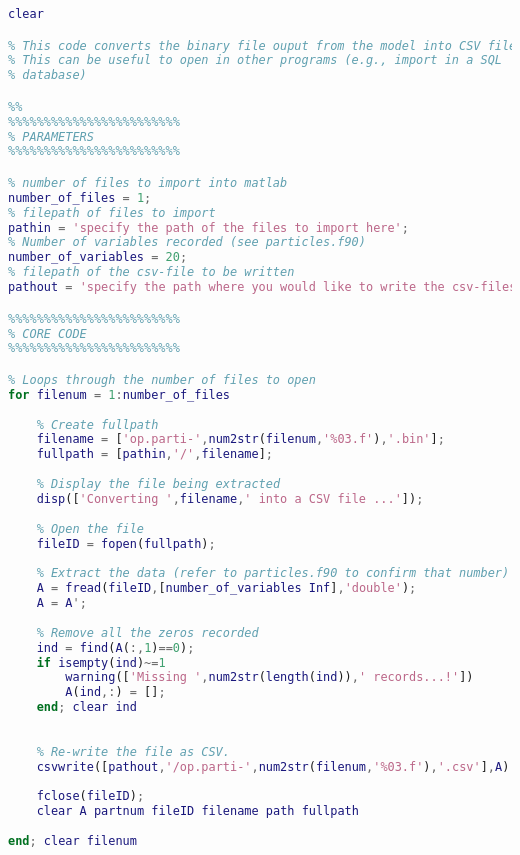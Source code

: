 \begin{lstlisting}[language=matlab]
clear

% This code converts the binary file ouput from the model into CSV files.
% This can be useful to open in other programs (e.g., import in a SQL
% database)

%%
%%%%%%%%%%%%%%%%%%%%%%%%
% PARAMETERS
%%%%%%%%%%%%%%%%%%%%%%%%

% number of files to import into matlab
number_of_files = 1;
% filepath of files to import
pathin = 'specify the path of the files to import here';
% Number of variables recorded (see particles.f90)
number_of_variables = 20;
% filepath of the csv-file to be written
pathout = 'specify the path where you would like to write the csv-files';

%%%%%%%%%%%%%%%%%%%%%%%%
% CORE CODE
%%%%%%%%%%%%%%%%%%%%%%%%

% Loops through the number of files to open
for filenum = 1:number_of_files
    
    % Create fullpath
    filename = ['op.parti-',num2str(filenum,'%03.f'),'.bin'];
    fullpath = [pathin,'/',filename];
    
    % Display the file being extracted
    disp(['Converting ',filename,' into a CSV file ...']);
    
    % Open the file
    fileID = fopen(fullpath);
    
    % Extract the data (refer to particles.f90 to confirm that number)
    A = fread(fileID,[number_of_variables Inf],'double');
    A = A';
    
    % Remove all the zeros recorded
    ind = find(A(:,1)==0);
    if isempty(ind)~=1
        warning(['Missing ',num2str(length(ind)),' records...!'])
        A(ind,:) = [];
    end; clear ind
    
    
    % Re-write the file as CSV.
    csvwrite([pathout,'/op.parti-',num2str(filenum,'%03.f'),'.csv'],A)
    
    fclose(fileID);
    clear A partnum fileID filename path fullpath
    
end; clear filenum
\end{lstlisting}
